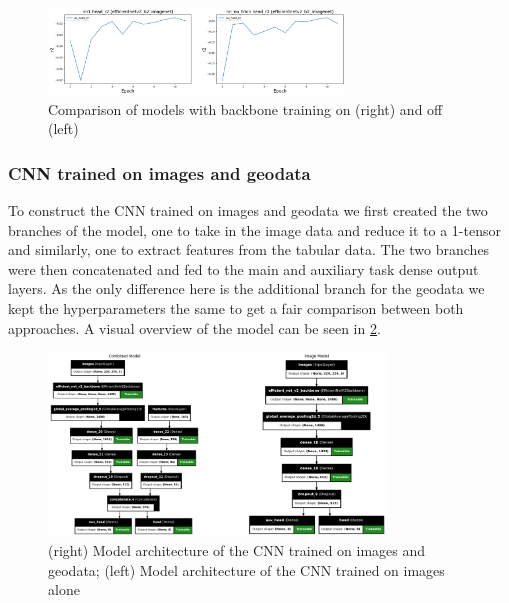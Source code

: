 \documentclass[12pt,a4paper,oneside]{article}
\begin{document}

\begin{figure}[!h]
    \centering
    \includegraphics[width=0.7\textwidth]{assets/train_vs_notrain.png}
    \caption{Comparison of models with backbone training on (right) and off (left)}
    \label{fig:backbone_training}
\end{figure}

\subsubsection{CNN trained on images and geodata}

To construct the CNN trained on images and geodata we first created the two branches of the model, one to take in the image data and reduce it to a 1-tensor and similarly, one to extract features from the tabular data. The two branches were then concatenated and fed to the main and auxiliary task dense output layers. As the only difference here is the additional branch for the geodata we kept the hyperparameters the same to get a fair comparison between both approaches. A visual overview of the model can be seen in \ref{fig:geodata_model}.

\begin{figure}[!h]
    \centering 
    \includegraphics[width=0.8\textwidth]{assets/img_geo_model.png}
    \caption{(right) Model architecture of the CNN trained on images and geodata; (left) Model architecture of the CNN trained on images alone}
    \label{fig:geodata_model}
\end{figure}
\end{document}
